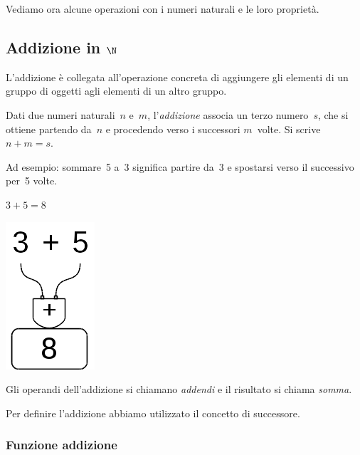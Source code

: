 Vediamo ora alcune operazioni con i numeri naturali e le loro proprietà.

\subsection{Addizione in $\N$}

L'addizione è collegata all'operazione concreta di aggiungere gli elementi di 
un gruppo di oggetti agli elementi di un altro gruppo.

\begin{definizione}
  Dati due numeri naturali~\(n\) e~\(m\), l'\emph{addizione} associa un terzo 
  numero~\(s\), che si ottiene partendo da~\(n\) e procedendo verso i 
  successori \(m\)~volte. Si scrive~\(n+m=s\).
\end{definizione}

Ad esempio: sommare~5 a~3 significa partire da~3 e spostarsi verso il 
successivo per~5 volte.

\begin{minipage}{0.80\textwidth}
 \centering
 \(3+5=8\)

 
\end{minipage}%
\begin{minipage}{0.15\textwidth}
 \centering
\begin{inaccessibleblock}
 \includegraphics[scale=0.35]{img/op_add.png}
\end{inaccessibleblock}
\end{minipage}%

Gli operandi dell'addizione si chiamano \emph{addendi} e il risultato si 
chiama \emph{somma}.

\osservazione Per definire l'addizione abbiamo utilizzato il concetto di 
successore.

\subsubsection{Funzione addizione}

